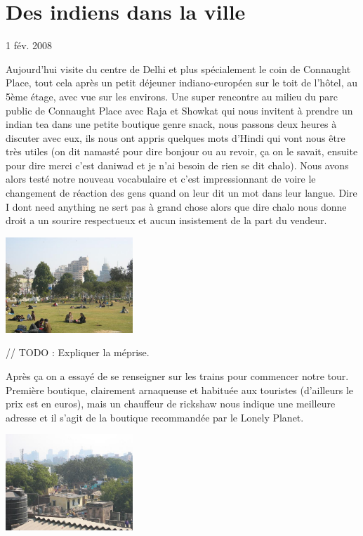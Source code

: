 \section{Des indiens dans la ville}

1 fév. 2008

\begin{multicols}{2}


Aujourd'hui visite du centre de Delhi et plus spécialement le coin de Connaught Place, tout cela après un petit déjeuner indiano-européen sur le toit de l’hôtel, au 5ème étage, avec vue sur les environs. Une super rencontre au milieu du parc public de Connaught Place avec Raja et Showkat qui nous invitent à prendre un indian tea dans une petite boutique genre snack, nous passons deux heures à discuter avec eux, ils nous ont appris quelques mots d’Hindi qui vont nous être très utiles (on dit namasté pour dire bonjour ou au revoir, ça on le savait, ensuite pour dire merci c’est daniwad et je n’ai besoin de rien se dit chalo). Nous avons alors testé notre nouveau vocabulaire et c’est impressionnant de voire le changement de réaction des gens quand on leur dit un mot dans leur langue. Dire I dont need anything ne sert pas à grand chose alors que dire chalo nous donne droit a un sourire respectueux et aucun insistement de la part du vendeur.

\hspace*{-0.65cm}
\includegraphics[width=4.8cm]{articles/Des-indiens-dans-la-ville/connaughtplace.jpg}

// TODO : Expliquer la méprise.

Après ça on a essayé de se renseigner sur les trains pour commencer notre tour.
Première boutique, clairement arnaqueuse et habituée aux touristes (d’ailleurs le prix est en euros), mais un chauffeur de rickshaw nous indique une meilleure adresse et il s’agit de la boutique recommandée par le Lonely Planet.

\hspace*{-0.65cm}
\includegraphics[width=4.8cm]{articles/Des-indiens-dans-la-ville/toithotel.jpg}


\end{multicols}

